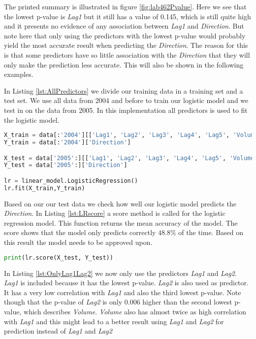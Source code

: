 The printed summary is illustrated in figure \ref{fig:lab462Pvalue}. Here we see that the lowest p-value is \emph{Lag1} but it still has a value of 0.145, which is still quite high and it presents no evidence of any association between \emph{Lag1} and \emph{Direction}. But note here that only using the predictors with the lowest p-value would probably yield the most accurate result when predicting the \emph{Direction}. The reason for this is that some predictors have so little association with the \emph{Direction} that they will only make the prediction less accurate. This will also be shown in the following examples.


In Listing \ref{lst:AllPredictors} we divide our training data in a training set and a test set. We use all data from 2004 and before to train our logistic model and we test in on the data from 2005.  In this implementation all predictors is used to fit the logistic model.

\begin{lstlisting}[language=Python, label=lst:AllPredictors, caption=Logistic regression using all predictors]
X_train = data[:'2004'][['Lag1', 'Lag2', 'Lag3', 'Lag4', 'Lag5', 'Volume']]
Y_train = data[:'2004']['Direction']

X_test = data['2005':][['Lag1', 'Lag2', 'Lag3', 'Lag4', 'Lag5', 'Volume']]
Y_test = data['2005':]['Direction']

lr = linear_model.LogisticRegression()
lr.fit(X_train,Y_train)
\end{lstlisting}

Based on our our test data we check how well our logistic model predicts the \emph{Direction}. In Listing \ref{lst:LRscore} a score method is called for the logistic regression model. This function returns the mean accuracy of the model. The score shows that the model only predicts correctly $48.8\%$ of the time. Based on this result the model needs to be approved upon.
\begin{lstlisting}[language=Python, label=lst:LRscore, caption=Logistic regression using all predictors]
print(lr.score(X_test, Y_test))
\end{lstlisting}

In Listing \ref{lst:OnlyLag1Lag2} we now only use the predictors \emph{Lag1} and \emph{Lag2}. \emph{Lag1} is included because it has the lowest p-value. \emph{Lag2} is also used as predictor. It has a very low correlation with \emph{Lag1} and also the third lowest p-value. Note though that the p-value of \emph{Lag2} is only 0.006 higher than the second lowest p-value, which describes \emph{Volume}. \emph{Volume} also has almost twice as high correlation with \emph{Lag1} and this might lead to a better result using \emph{Lag1} and \emph{Lag2} for prediction instead of \emph{Lag1} and \emph{Lag2}

